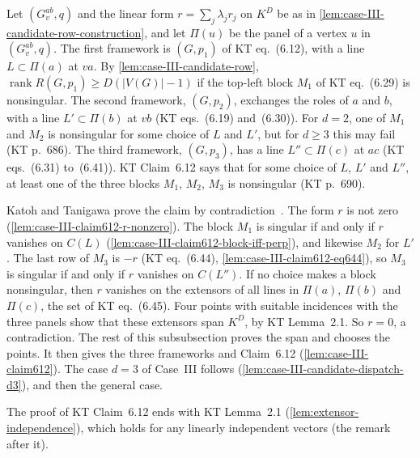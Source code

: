 Let $(G_v^{ab}, q)$ and the linear form $r = \sum_j \lambda_j r_j$ on
$K^D$ be as in \cref{lem:case-III-candidate-row-construction}, and let
$\Pi(u)$ be the panel of a vertex $u$ in $(G_v^{ab}, q)$. The first
framework is $(G, p_1)$ of KT eq.~(6.12), with a line
$L \subset \Pi(a)$ at $va$. By \cref{lem:case-III-candidate-row},
$\operatorname{rank} R(G, p_1) \ge D(|V(G)| - 1)$ if the top-left
block $M_1$ of KT eq.~(6.29) is nonsingular. The second framework,
$(G, p_2)$, exchanges the roles of $a$ and $b$, with a line
$L' \subset \Pi(b)$ at $vb$ (KT eqs.~(6.19) and~(6.30)). For $d = 2$,
one of $M_1$ and $M_2$ is nonsingular for some choice of $L$ and $L'$,
but for $d \ge 3$ this may fail (KT p.~686). The third framework,
$(G, p_3)$, has a line $L'' \subset \Pi(c)$ at $ac$ (KT eqs.~(6.31)
to~(6.41)). KT Claim~6.12 says that for some choice of $L$, $L'$ and
$L''$, at least one of the three blocks $M_1$, $M_2$, $M_3$ is
nonsingular (KT p.~690).

Katoh and Tanigawa prove the claim by
contradiction~\cite[pp.~690--691]{katohTanigawa2011}. The form $r$ is
not zero (\cref{lem:case-III-claim612-r-nonzero}). The block $M_1$ is
singular if and only if $r$ vanishes on $C(L)$
(\cref{lem:case-III-claim612-block-iff-perp}), and likewise $M_2$ for
$L'$. The last row of $M_3$ is $-r$ (KT eq.~(6.44),
\cref{lem:case-III-claim612-eq644}), so $M_3$ is
singular if and only if $r$ vanishes on $C(L'')$. If no choice makes a
block nonsingular, then $r$ vanishes on the extensors of all lines in
$\Pi(a)$, $\Pi(b)$ and $\Pi(c)$, the set of KT eq.~(6.45). Four points
with suitable incidences with the three panels show that these
extensors span $K^D$, by KT Lemma~2.1. So $r = 0$, a contradiction.
The rest of this subsubsection proves the span and chooses the points.
It then gives the three frameworks and Claim~6.12
(\cref{lem:case-III-claim612}). The case $d = 3$ of Case~III follows
(\cref{lem:case-III-candidate-dispatch-d3}), and then the general
case.

The proof of KT Claim~6.12 ends with KT Lemma~2.1
(\cref{lem:extensor-independence}), which holds for any linearly
independent vectors (the remark after it).

